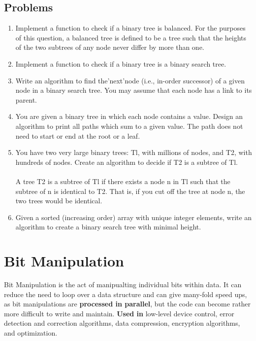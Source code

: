 \documentclass{article}
\begin{document}
\subsection{Problems}
	\begin{enumerate}
		\item Implement a function to check if a binary tree is balanced. For the purposes of this question, a balanced tree is defined to be a tree such that the heights of the two subtrees of any node never differ by more than one.
		\item Implement a function to check if a binary tree is a binary search tree.
		\item Write an algorithm to find the'next'node (i.e., in-order successor) of a given node in a binary search tree. You may assume that each node has a link to its parent.
		\item You are given a binary tree in which each node contains a value. Design an algorithm to print all paths which sum to a given value. The path does not need to start or end at the root or a leaf.
		\item You have two very large binary trees: Tl, with millions of nodes, and T2, with hundreds of nodes. Create an algorithm to decide if T2 is a subtree of Tl.
		\\ \\
		A tree T2 is a subtree of Tl if there exists a node n in Tl such that the subtree of n is identical to T2. That is, if you cut off the tree at node n, the two trees would be identical.
		\item Given a sorted (increasing order) array with unique integer elements, write an algorithm to create a binary search tree with minimal height.
	\end{enumerate}





\clearpage
\section{Bit Manipulation}
Bit Manipulation is the act of manipualting individual bits within data. It can reduce the need to loop over a data structure and can give many-fold speed ups, as bit manipulations are {\bf processed in parallel}, but the code can become rather more difficult to write and maintain. {\bf Used in} low-level device control, error detection and correction algorithms, data compression, encryption algorithms, and optimization.
\end{document}
